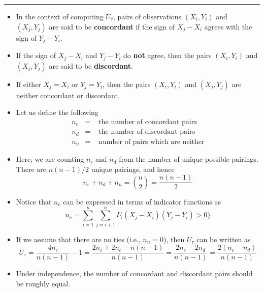 \documentclass[]{book}
\begin{document}
\begin{center}\rule{0.5\linewidth}{\linethickness}\end{center}

\begin{itemize}
\item
  In the context of computing \(U_{\tau}\), pairs of observations \((X_{i}, Y_{i})\) and \((X_{j}, Y_{j})\) are said to be \textbf{concordant} if
  the sign of \(X_{j} - X_{i}\) agrees with the sign of \(Y_{j} - Y_{i}\).
\item
  If the sign of \(X_{j} - X_{i}\) and \(Y_{j} - Y_{i}\) do \textbf{not} agree, then the
  pairs \((X_{i}, Y_{i})\) and \((X_{j}, Y_{j})\) are said to be \textbf{discordant}.
\item
  If either \(X_{j}=X_{i}\) or \(Y_{j}=Y_{i}\), then the pairs \((X_{i}, Y_{i})\) and \((X_{j}, Y_{j})\)
  are neither concordant or discordant.
\item
  Let us define the following
  \begin{eqnarray}
  n_{c} &=& \textrm{ the number of concordant pairs} \nonumber \\
  n_{d} &=& \textrm{ the number of discordant pairs} \nonumber \\
  n_{n} &=& \textrm{ number of pairs which are neither}  \nonumber
  \end{eqnarray}
\item
  Here, we are counting \(n_{c}\) and \(n_{d}\) from the number of unique possible pairings. There
  are \(n(n-1)/2\) unique pairings, and hence
  \begin{equation}
  n_{c} + n_{d} + n_{n} = {n \choose 2} = \frac{n(n-1)}{2}
  \end{equation}
\item
  Notice that \(n_{c}\) can be expressed in terms of indicator functions as
  \begin{equation}
  n_{c} = \sum_{i=1}^{n}\sum_{j=i+1}^{n} I\Big\{ (X_{j} - X_{i})(Y_{j} - Y_{i}) > 0 \Big\} \nonumber
  \end{equation}
\item
  If we assume that there are no ties (i.e., \(n_{n} = 0\)), then \(U_{\tau}\)
  can be written as
  \begin{equation}
  U_{\tau} = \frac{4n_{c}}{n(n-1)} - 1
  = \frac{2n_{c} + 2n_{c} - n(n - 1)}{n(n-1)}
  = \frac{2n_{c} - 2n_{d} }{n(n-1)} 
  = \frac{2(n_{c} - n_{d})}{n(n-1)} \nonumber
  \end{equation}
\item
  Under independence, the number of concordant and discordant pairs should be roughly equal.
\end{itemize}
\end{document}
